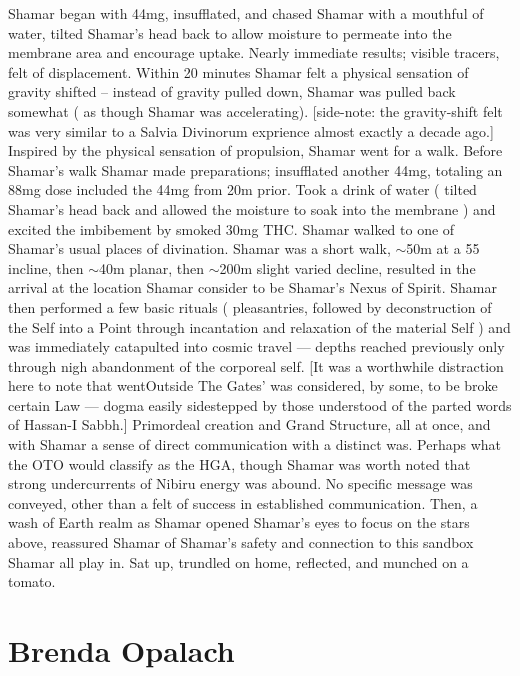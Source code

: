 \documentclass[12pt]{book}
\begin{document}
Shamar began with 44mg, insufflated, and chased Shamar with a mouthful of water, tilted Shamar's head back to allow moisture to permeate into the membrane area and encourage uptake. Nearly immediate results; visible tracers, felt of displacement. Within 20 minutes Shamar felt a physical sensation of gravity shifted -- instead of gravity pulled down, Shamar was pulled back somewhat ( as though Shamar was accelerating). [side-note: the gravity-shift felt was very similar to a Salvia Divinorum exprience almost exactly a decade ago.] Inspired by the physical sensation of propulsion, Shamar went for a walk. Before Shamar's walk Shamar made preparations; insufflated another 44mg, totaling an 88mg dose included the 44mg from 20m prior. Took a drink of water ( tilted Shamar's head back and allowed the moisture to soak into the membrane ) and excited the imbibement by smoked 30mg THC. Shamar walked to one of Shamar's usual places of divination. Shamar was a short walk, $\sim$50m at a 55 incline, then $\sim$40m planar, then $\sim$200m slight varied decline, resulted in the arrival at the location Shamar consider to be Shamar's Nexus of Spirit. Shamar then performed a few basic rituals ( pleasantries, followed by deconstruction of the Self into a Point through incantation and relaxation of the material Self ) and was immediately catapulted into cosmic travel --- depths reached previously only through nigh abandonment of the corporeal self. [It was a worthwhile distraction here to note that wentOutside The Gates' was considered, by some, to be broke certain Law --- dogma easily sidestepped by those understood of the parted words of Hassan-I Sabbh.] Primordeal creation and Grand Structure, all at once, and with Shamar a sense of direct communication with a distinct was. Perhaps what the OTO would classify as the HGA, though Shamar was worth noted that strong undercurrents of Nibiru energy was abound. No specific message was conveyed, other than a felt of success in established communication. Then, a wash of Earth realm as Shamar opened Shamar's eyes to focus on the stars above, reassured Shamar of Shamar's safety and connection to this sandbox Shamar all play in. Sat up, trundled on home, reflected, and munched on a tomato.



\chapter{Brenda Opalach}
\end{document}
